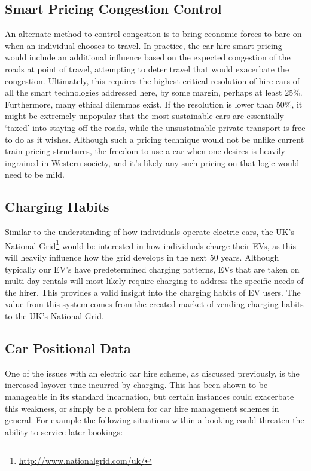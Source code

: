 \documentclass[conference]{IEEEtran}
\begin{document}
\subsection{Smart Pricing Congestion Control}

An alternate method to control congestion is to bring economic forces
to bare on when an individual chooses to travel. In practice, the car
hire smart pricing would include an additional influence based on the
expected congestion of the roads at point of travel, attempting to
deter travel that would exacerbate the congestion.  Ultimately, this
requires the highest critical resolution of hire cars of all the smart
technologies addressed here, by some margin, perhaps at least
25\%. Furthermore, many ethical dilemmas exist. If the resolution is
lower than 50\%, it might be extremely unpopular that the most
sustainable cars are essentially `taxed' into staying off the roads,
while the unsustainable private transport is free to do as it
wishes. Although such a pricing technique would not be unlike current
train pricing structures, the freedom to use a car when one desires is
heavily ingrained in Western society, and it's likely any such pricing
on that logic would need to be mild.


\subsection{Charging Habits}

Similar to the understanding of how individuals operate electric cars,
the UK's National Grid\footnote{\url{http://www.nationalgrid.com/uk/}}
would be interested in how individuals charge their EVs, as this will
heavily influence how the grid develops in the next 50 years.
Although typically our EV's have predetermined charging patterns, EVs
that are taken on multi-day rentals will most likely require charging
to address the specific needs of the hirer. This provides a valid
insight into the charging habits of EV users. The value from this
system comes from the created market of vending charging habits to the
UK's National Grid.


\subsection{Car Positional Data}

One of the issues with an electric car hire scheme, as discussed
previously, is the increased layover time incurred by charging. This
has been shown to be manageable in its standard incarnation, but
certain instances could exacerbate this weakness, or simply be a
problem for car hire management schemes in general. For example the
following situations within a booking could threaten the ability to
service later bookings:
\end{document}
